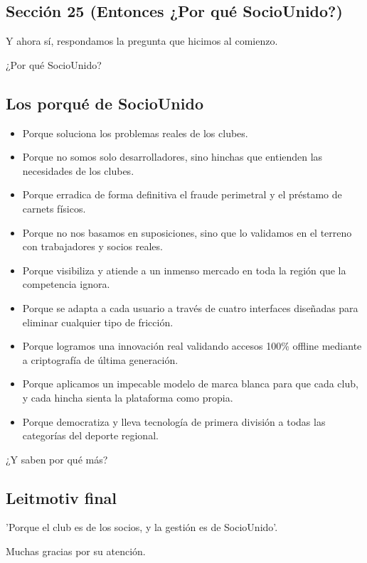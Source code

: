 \subsection{Sección 25 (Entonces ¿Por qué SocioUnido?)}

Y ahora sí, respondamos la pregunta que hicimos al comienzo.

¿Por qué SocioUnido?

\subsection*{Los porqué de SocioUnido}

\begin{itemize}
    \item Porque soluciona los problemas reales de los clubes.
    \item Porque no somos solo desarrolladores, sino hinchas que entienden las necesidades de los clubes.
    \item Porque erradica de forma definitiva el fraude perimetral y el préstamo de carnets físicos.
    \item Porque no nos basamos en suposiciones, sino que lo validamos en el terreno con trabajadores y socios reales.
    \item Porque visibiliza y atiende a un inmenso mercado en toda la región que la competencia ignora.
    \item Porque se adapta a cada usuario a través de cuatro interfaces diseñadas para eliminar cualquier tipo de fricción.
    \item Porque logramos una innovación real validando accesos 100\% offline mediante a criptografía de última generación.
    \item Porque aplicamos un impecable modelo de marca blanca para que cada club, y cada hincha sienta la plataforma como propia.
    \item Porque democratiza y lleva tecnología de primera división a todas las categorías del deporte regional.
\end{itemize}

¿Y saben por qué más?

\subsection*{Leitmotiv final}

'Porque el club es de los socios, y la gestión es de SocioUnido'.

Muchas gracias por su atención.

